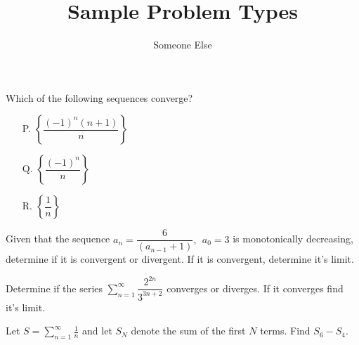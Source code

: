 \documentclass{ximera}
\title{Sample Problem Types }
\author{Someone Else}
\newcommand{\dsum}{\displaystyle\sum}
\begin{document}
\maketitle


\begin{problem}
    Which of the following sequences converge?
	\begin{enumerate}
		\item[P.] \(\left \{ \dfrac{(-1)^n(n+1)}{n}\right \}\)
	
		\item[Q.] \( \left \{ \dfrac{(-1)^n}{n} \right \} \)
		
		\item[R.] \(\left \{ \dfrac{1}{n} \right \} \)
	\end{enumerate}
\begin{multipleChoice}
\end{multipleChoice}
\end{problem}


\begin{problem}%
    Given that the sequence $a_n = \dfrac{6}{(a_{n-1}+1)}, \ \ a_0 = 3$ is monotonically decreasing, determine if it is convergent or divergent. If it is convergent, determine it's limit.
\begin{multipleChoice}
\choice{$\infty$}
\end{multipleChoice}
\end{problem}


\begin{problem}%
Determine if the series $\dsum\limits_{n=1}^{\infty} \dfrac{2^{2n}}{3^{3n + 2}}$ converges or diverges. If it converges find it's limit.
\begin{multipleChoice}
\end{multipleChoice}
\end{problem}

\begin{problem}
Let $S= \displaystyle \sum_{n=1}^\infty \frac 1 n$ and let $S_N$ denote the sum of the first $N$ terms. Find $S_6-S_4$.
\begin{multipleChoice} %
\end{multipleChoice}
\end{problem}
\end{document}
